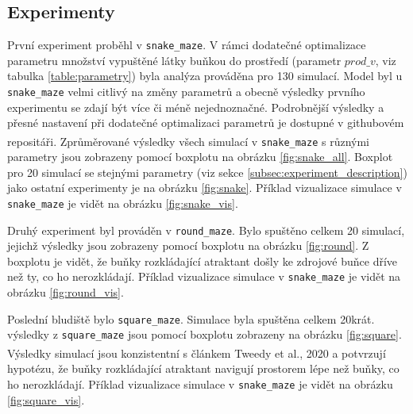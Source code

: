 \documentclass[10pt,a4paper,twocolumn]{article}
\begin{document}
\subsection{Experimenty}
\label{subsec:variant_comparision}

První experiment proběhl v \texttt{snake\_maze}. V rámci dodatečné optimalizace parametru množství vypuštěné látky buňkou do prostředí (parametr $prod\_v$, viz tabulka \ref{table:parametry}) byla analýza prováděna pro 130 simulací. Model byl u \texttt{snake\_maze} velmi citlivý na změny parametrů a obecně výsledky prvního experimentu se zdají být více či méně nejednoznačné. Podrobnější výsledky a přesné nastavení při dodatečné optimalizaci parametrů je dostupné v githubovém repositáři\textsuperscript{\cite{self_gen_gradient}}. Zprůměrované výsledky všech simulací v \texttt{snake\_maze} s různými parametry jsou zobrazeny pomocí boxplotu na obrázku \ref{fig:snake_all}. Boxplot pro 20 simulací se stejnými parametry (viz sekce \ref{subsec:experiment_description}) jako ostatní experimenty je na obrázku \ref{fig:snake}. Příklad vizualizace simulace v \texttt{snake\_maze} je vidět na obrázku \ref{fig:snake_vis}. 

Druhý experiment byl prováděn v \texttt{round\_maze}. Bylo spuštěno celkem 20 simulací, jejichž výsledky jsou zobrazeny pomocí boxplotu na obrázku \ref{fig:round}. Z boxplotu je vidět, že buňky rozkládající atraktant došly ke zdrojové buňce dříve než ty, co ho nerozkládají. Příklad vizualizace simulace v \texttt{snake\_maze} je vidět na obrázku \ref{fig:round_vis}. 

Poslední bludiště bylo \texttt{square\_maze}. Simulace byla spuštěna celkem 20krát. výsledky z \texttt{square\_maze} jsou pomocí boxplotu zobrazeny na obrázku \ref{fig:square}. Výsledky simulací jsou konzistentní s článkem Tweedy et al., 2020\textsuperscript{\cite{tweedy2020}} a potvrzují hypotézu, že buňky rozkládající atraktant navigují prostorem lépe než buňky, co ho nerozkládají. Příklad vizualizace simulace v \texttt{snake\_maze} je vidět na obrázku \ref{fig:square_vis}. 
\end{document}
